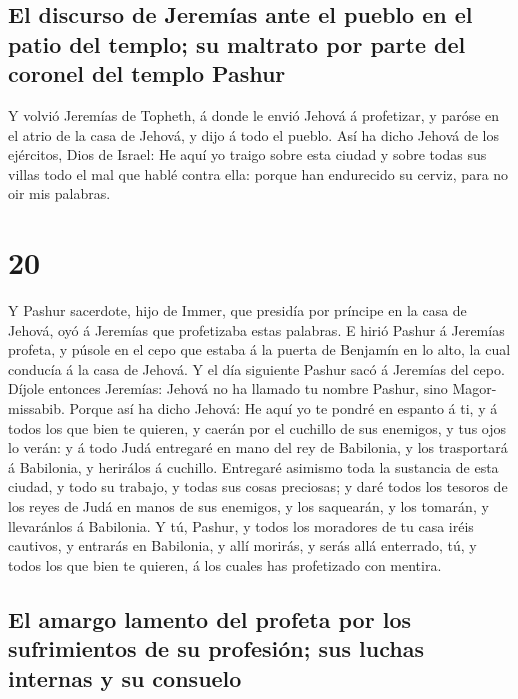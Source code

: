 \hypertarget{el-discurso-de-jeremuxedas-ante-el-pueblo-en-el-patio-del-templo-su-maltrato-por-parte-del-coronel-del-templo-pashur}{%
\subsection{El discurso de Jeremías ante el pueblo en el patio del
templo; su maltrato por parte del coronel del templo
Pashur}\label{el-discurso-de-jeremuxedas-ante-el-pueblo-en-el-patio-del-templo-su-maltrato-por-parte-del-coronel-del-templo-pashur}}

 Y volvió Jeremías de Topheth, á donde le envió Jehová á
profetizar, y paróse en el atrio de la casa de Jehová, y dijo á todo el
pueblo.  Así ha dicho Jehová de los ejércitos, Dios de
Israel: He aquí yo traigo sobre esta ciudad y sobre todas sus villas
todo el mal que hablé contra ella: porque han endurecido su cerviz, para
no oir mis palabras.

\hypertarget{section-24-20}{%
\section{20}\label{section-24-20}}

 Y Pashur sacerdote, hijo de Immer, que presidía por
príncipe en la casa de Jehová, oyó á Jeremías que profetizaba estas
palabras.  E hirió Pashur á Jeremías profeta, y púsole en
el cepo que estaba á la puerta de Benjamín en lo alto, la cual conducía
á la casa de Jehová.  Y el día siguiente Pashur sacó á
Jeremías del cepo. Díjole entonces Jeremías: Jehová no ha llamado tu
nombre Pashur, sino Magor-missabib.  Porque así ha dicho
Jehová: He aquí yo te pondré en espanto á ti, y á todos los que bien te
quieren, y caerán por el cuchillo de sus enemigos, y tus ojos lo verán:
y á todo Judá entregaré en mano del rey de Babilonia, y los trasportará
á Babilonia, y herirálos á cuchillo.  Entregaré asimismo
toda la sustancia de esta ciudad, y todo su trabajo, y todas sus cosas
preciosas; y daré todos los tesoros de los reyes de Judá en manos de sus
enemigos, y los saquearán, y los tomarán, y llevaránlos á Babilonia.
 Y tú, Pashur, y todos los moradores de tu casa iréis
cautivos, y entrarás en Babilonia, y allí morirás, y serás allá
enterrado, tú, y todos los que bien te quieren, á los cuales has
profetizado con mentira.

\hypertarget{el-amargo-lamento-del-profeta-por-los-sufrimientos-de-su-profesiuxf3n-sus-luchas-internas-y-su-consuelo}{%
\subsection{El amargo lamento del profeta por los sufrimientos de su
profesión; sus luchas internas y su
consuelo}\label{el-amargo-lamento-del-profeta-por-los-sufrimientos-de-su-profesiuxf3n-sus-luchas-internas-y-su-consuelo}}


